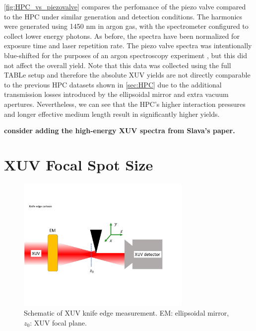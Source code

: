\cref{fig:HPC_vs_piezovalve} compares the perfomance of the piezo valve compared to the HPC under similar generation and detection conditions. The harmonics were generated using 1450 nm in argon gas, with the spectrometer configured to collect lower energy photons. As before, the spectra have been normalized for exposure time and laser repetition rate. The piezo valve spectra was intentionally blue-shifted for the purposes of an argon spectroscopy experiment \cite{hagemanComplexAttosecondTransientAbsorption2020}, but this did not affect the overall yield. Note that this data was collected using the full TABLe setup and therefore the absolute XUV yields are not directly comparable to the previous HPC datasets shown in \cref{sec:HPC} due to the additional transmission losses introduced by the ellipsoidal mirror and extra vacuum apertures. Nevertheless, we can see that the HPC's higher interaction pressures and longer effective medium length result in significantly higher yields.



\textbf{consider adding the high-energy XUV spectra from Slava's paper.}

\section{XUV Focal Spot Size}
\label{sec:XUV_knife_edge}

\begin{figure}
	\centering
	\includegraphics[width=0.75\textwidth]{figures/chap3/knife_edge_cartoon.pdf}
	\caption{Schematic of XUV knife edge measurement. EM: ellipsoidal mirror, $z_0$: XUV focal plane.}
	\label{fig:knife_edge_cartoon}
\end{figure}


